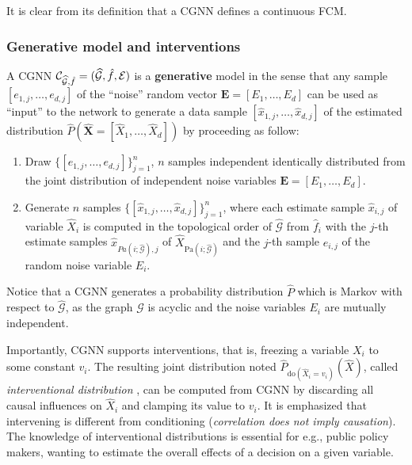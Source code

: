 \documentclass[a4paper, 11pt]{article}
\begin{document}
It is clear from its definition that a CGNN defines a continuous FCM. 

\subsubsection{Generative model and interventions} 

A CGNN $\mathcal{C}_{\widehat{\mathcal{G}},\hat{f}} = (\widehat{\mathcal{G}}, \hat{f}, {\cal E})$ is a \textbf{generative} model in the sense that any sample   $[e_{1,j}, \ldots, e_{d,j}]$ of the ``noise'' random vector ${\mathbf E} = [E_1,
\ldots, E_d]$ can be used as ``input'' to the network to generate a data sample $[\hat{x}_{1,j}, \ldots, \hat{x}_{d,j}]$ of the estimated distribution $\hat{P}(\hat{{\mathbf X}} = [\hat{X}_1,\ldots, \hat{X}_d])$ by proceeding as follow:

\begin{enumerate}
\item Draw $\{ [e_{1,j}, \ldots, e_{d,j}] \}_{j=1}^n$, $n$ samples independent identically distributed from the joint distribution of independent noise variables ${\mathbf E} = [E_1, \ldots, E_d]$.
\item Generate $n$ samples $\{ [\hat{x}_{1,j}, \ldots, \hat{x}_{d,j}] \}_{j=1}^{n}$, where each estimate sample $\hat{x}_{i,j}$ of variable $\hat{X}_i$ is computed in the topological order of $\widehat{\mathcal{G}}$ from $\hat{f}_i$ with the $j$-th estimate samples $\hat{x}_{Pa(i;\hat{\mathcal{G}}),j}$ of $\hat{X}_{\text{Pa}(i; \hat{\mathcal{G}})}$ and the $j$-th sample $e_{i,j}$ of the random noise variable $E_i$.
\end{enumerate}

Notice that a CGNN generates a probability distribution $\hat{P}$ which is Markov with respect to $\widehat{\mathcal{G}}$, as the graph  $\widehat{\mathcal{G}}$ is acyclic and the noise variables $E_i$ are mutually independent. 

Importantly, CGNN supports interventions, that is, freezing a variable $X_i$ to some constant $v_i$. The resulting joint distribution noted $\hat{P}_{\text{do}(\hat{X}_i = v_i)}(\hat{X})$, called  \emph{interventional distribution} \citep{pearl2009causality}, can be computed from CGNN by discarding all causal influences on $\hat{X}_i$ and clamping its value to $v_i$.  It is emphasized that intervening is different from conditioning (\emph{correlation does not imply causation}). The knowledge of interventional distributions is essential for e.g., public policy makers, wanting to estimate the overall effects of a decision on a given variable. 
\end{document}
